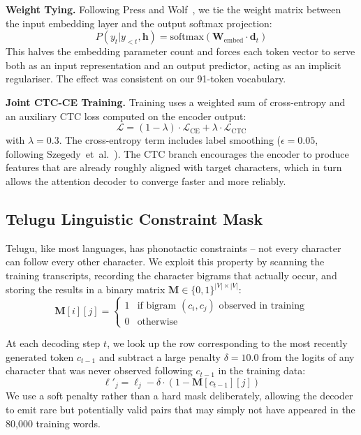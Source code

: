 \documentclass[conference]{IEEEtran}
\begin{document}
\textbf{Weight Tying.} Following Press and Wolf~\cite{press2017output}, we tie the weight matrix between the input embedding layer and the output softmax projection:
\begin{equation}
    P(y_t | y_{<t}, \mathbf{h}) = \text{softmax}(\mathbf{W}_{\text{embed}} \cdot \mathbf{d}_t)
\end{equation}
This halves the embedding parameter count and forces each token vector to serve both as an input representation and an output predictor, acting as an implicit regulariser. The effect was consistent on our 91-token vocabulary.

\textbf{Joint CTC-CE Training.} Training uses a weighted sum of cross-entropy and an auxiliary CTC loss computed on the encoder output:
\begin{equation}
    \mathcal{L} = (1 - \lambda) \cdot \mathcal{L}_{\text{CE}} + \lambda \cdot \mathcal{L}_{\text{CTC}}
    \label{eq:joint_loss}
\end{equation}
with $\lambda = 0.3$. The cross-entropy term includes label smoothing ($\epsilon = 0.05$, following Szegedy~et~al.~\cite{szegedy2016rethinking}). The CTC branch encourages the encoder to produce features that are already roughly aligned with target characters, which in turn allows the attention decoder to converge faster and more reliably.

\subsection{Telugu Linguistic Constraint Mask}

Telugu, like most languages, has phonotactic constraints -- not every character can follow every other character. We exploit this property by scanning the training transcripts, recording the character bigrams that actually occur, and storing the results in a binary matrix $\mathbf{M} \in \{0, 1\}^{|V| \times |V|}$:
\begin{equation}
    \mathbf{M}[i][j] = \begin{cases} 1 & \text{if bigram } (c_i, c_j) \text{ observed in training} \\ 0 & \text{otherwise} \end{cases}
\end{equation}

At each decoding step $t$, we look up the row corresponding to the most recently generated token $c_{t-1}$ and subtract a large penalty $\delta = 10.0$ from the logits of any character that was never observed following $c_{t-1}$ in the training data:
\begin{equation}
    \ell'_j = \ell_j - \delta \cdot (1 - \mathbf{M}[c_{t-1}][j])
\end{equation}
We use a soft penalty rather than a hard mask deliberately, allowing the decoder to emit rare but potentially valid pairs that may simply not have appeared in the 80,000 training words.
\end{document}
